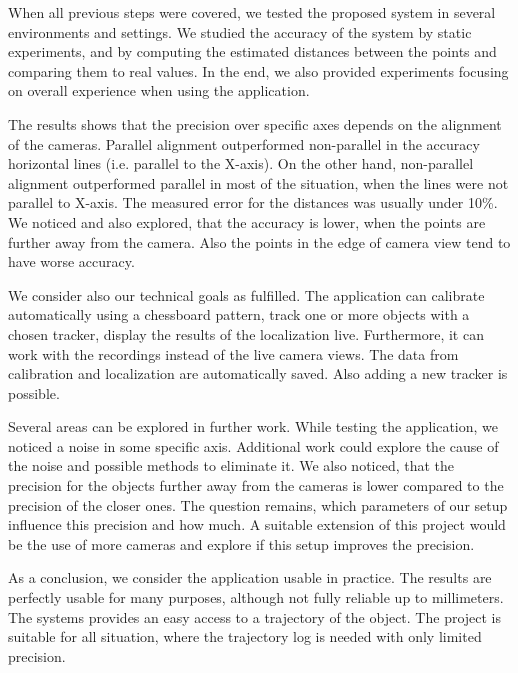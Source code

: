 When all previous steps were covered, we tested the proposed system in several
environments and settings. We studied the accuracy of the system by static
experiments, and by computing the estimated distances between the points and
comparing them to real values. In the end, we also provided experiments focusing
on overall experience when using the application.

The results shows that the precision over specific axes depends on the
alignment of the cameras. Parallel alignment outperformed non-parallel in the
accuracy horizontal lines (i.e. parallel to the X-axis). On the other hand,
non-parallel alignment outperformed parallel in most of the situation, when the
lines were not parallel to X-axis. The measured error for the distances was
usually under 10\%. We noticed and also explored, that the accuracy is lower,
when the points are further away from the camera. Also the points in the edge
of camera view tend to have worse accuracy.


\bigskip

We consider also our technical goals as fulfilled. The application can
calibrate automatically using a chessboard pattern, track one or more objects
with a chosen tracker, display the results of the localization live.
Furthermore, it can work with the recordings instead of the live camera views.
The data from calibration and localization are automatically saved. Also
adding a new tracker is possible.

\bigskip

Several areas can be explored in further work. While testing the application,
we noticed a noise in some specific axis. Additional work could explore the
cause of the noise and possible methods to eliminate it. We also noticed, that
the precision for the objects further away from the cameras is lower compared to
the precision of the closer ones. The question remains, which parameters of our
setup influence this precision and how much. A suitable extension of this
project would be the use of more cameras and explore if this setup improves the
precision.


\bigskip
As a conclusion, we consider the application usable in practice. The results
are perfectly usable for many purposes, although not fully reliable up to
millimeters. The systems provides an easy access to a trajectory of the object.
The project is suitable for all situation, where the trajectory log is needed
with only limited precision.
